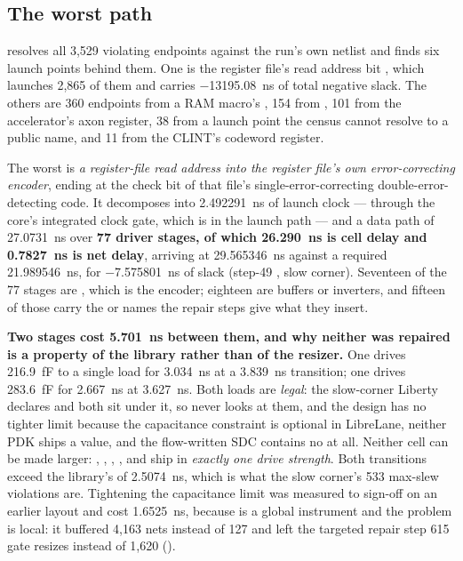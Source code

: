 \subsection{The worst path}

 resolves all 3,529
violating endpoints against the run's own netlist and finds six launch
points behind them. One is the register file's read address bit
, which launches 2,865 of them and carries
\qty{-13195.08}{\nano\second} of total negative slack. The others are
360 endpoints from a RAM macro's , 154 from
, 101 from the accelerator's axon register, 38 from
a launch point the census cannot resolve to a public name, and 11 from
the CLINT's  codeword register.

The worst is \emph{a register-file read address into the register file's
own error-correcting encoder}, ending at the check bit
 of that file's
single-error-correcting double-error-detecting code. It decomposes into \qty{2.492291}{\nano\second} of launch clock ---
through the core's integrated clock gate, which is in the launch path
--- and a data path of \qty{27.0731}{\nano\second} over \textbf{77
driver stages, of which \qty{26.290}{\nano\second} is cell delay and
\qty{0.7827}{\nano\second} is net delay}, arriving at
\qty{29.565346}{\nano\second} against a required
\qty{21.989546}{\nano\second}, for \qty{-7.575801}{\nano\second} of
slack (step-49 , slow corner). Seventeen of the 77 stages
are , which is the encoder; eighteen are buffers
or inverters, and fifteen of those carry the  or
 names the repair steps give what they insert.

\textbf{Two stages cost \qty{5.701}{\nano\second} between them, and why
neither was repaired is a property of the library rather than of the
resizer.} One  drives \qty{216.9}{\femto\farad}
to a single load for \qty{3.034}{\nano\second} at a
\qty{3.839}{\nano\second} transition; one  drives
\qty{283.6}{\femto\farad} for \qty{2.667}{\nano\second} at
\qty{3.627}{\nano\second}. Both loads are \emph{legal}: the slow-corner
Liberty declares  and
both sit under it, so  never looks at them, and the
design has no tighter limit because the capacitance constraint is
optional in LibreLane, neither PDK ships a value, and the flow-written
SDC contains no  at all. Neither cell can be
made larger: , , , ,
 and  ship in \emph{exactly one drive
strength}. Both transitions exceed the library's
 of
\qty{2.5074}{\nano\second}, which is what the slow corner's 533 max-slew
violations are. Tightening the capacitance limit was measured to
sign-off on an earlier layout and cost \qty{1.6525}{\nano\second},
because  is a global instrument and the problem is
local: it buffered 4,163 nets instead of 127 and left the targeted
repair step 615 gate resizes instead of 1,620
().

